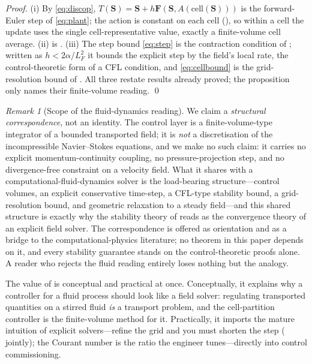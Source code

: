 \documentclass[11pt,a4paper,twocolumn]{article}
\theoremstyle{thmstyle}
\theoremstyle{definition}
\theoremstyle{remark}
\newtheorem{remark}[theorem]{Remark}
\newcommand{\Ss}{\mathbf{S}}
\begin{document}
\begin{proof}
(i) By \eqref{eq:discop}, $T(\Ss)=\Ss+h\mathbf F(\Ss,A(\mathrm{cell}(\Ss)))$
is the forward-Euler step of \eqref{eq:plant}; the action is constant on
each cell (), so within a cell the update uses the
single cell-representative value, exactly a finite-volume cell average.
(ii) is . (iii) The step bound \eqref{eq:step} is the
contraction condition of ; written as
$h<2\alpha/L_F^2$ it bounds the explicit step by the field's local rate,
the control-theoretic form of a CFL condition, and \eqref{eq:cellbound} is
the grid-resolution bound of . All three restate results
already proved; the proposition only names their finite-volume reading.
\qed
\end{proof}

\begin{remark}[Scope of the fluid-dynamics reading]
\label{rem:fvm-scope}
We claim a \emph{structural correspondence}, not an identity. The control
layer is a finite-volume-type integrator of a bounded transported field;
it is \emph{not} a discretisation of the incompressible Navier--Stokes
equations, and we make no such claim: it carries no explicit
momentum-continuity coupling, no pressure-projection step, and no
divergence-free constraint on a velocity field. What it shares with a
computational-fluid-dynamics solver is the load-bearing structure---control
volumes, an explicit conservative time-step, a CFL-type stability bound, a
grid-resolution bound, and geometric relaxation to a steady field---and
this shared structure is exactly why the stability theory of
 reads as the convergence theory of an explicit field
solver. The correspondence is offered as orientation and as a bridge to the
computational-physics literature; no theorem in this paper depends on it,
and every stability guarantee stands on the control-theoretic proofs
alone. A reader who rejects the fluid reading entirely loses nothing but
the analogy.
\end{remark}

The value of  is conceptual and practical at once.
Conceptually, it explains why a controller for a fluid process should look
like a field solver: regulating transported quantities on a stirred fluid
\emph{is} a transport problem, and the cell-partition controller is the
finite-volume method for it. Practically, it imports the mature
intuition of explicit solvers---refine the grid and you must shorten the
step ( jointly); the Courant number is the
ratio the engineer tunes---directly into control commissioning.
\end{document}
